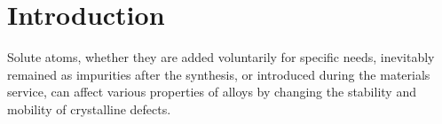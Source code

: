 \section{Introduction}
Solute atoms, whether they are added voluntarily for specific needs, inevitably remained as impurities after the synthesis, or introduced during the materials service, can affect various properties of alloys by changing the stability and mobility of crystalline defects.